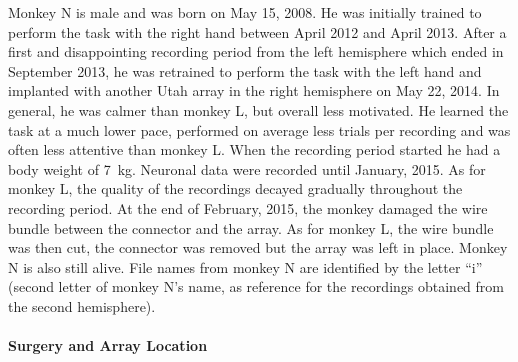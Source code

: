 {Monkey N is male and was born on May 15, 2008. He was initially trained to perform the task with the right hand between April 2012 and April 2013. After a first and disappointing recording period from the left hemisphere which ended in September 2013, he was retrained to perform the task with the left hand and implanted with another Utah array in the right hemisphere on May 22, 2014. In general, he was calmer than monkey L, but overall less motivated. He learned the task at a much lower pace, performed on average less trials per recording and was often less attentive than monkey L. When the recording period started he had a body weight of 7 kg. Neuronal data were recorded until January, 2015. As for monkey L, the quality of the recordings decayed gradually throughout the recording period. At the end of February, 2015, the monkey damaged the wire bundle between the connector and the array. As for monkey L, the wire bundle was then cut, the connector was removed but the array was left in place. Monkey N is also still alive. File names from monkey N are identified by the letter “i” (second letter of monkey N’s name, as reference for the recordings obtained from the second hemisphere). 

\paragraph{Surgery and Array Location}
\label{sec:surgery_array_location}

}
